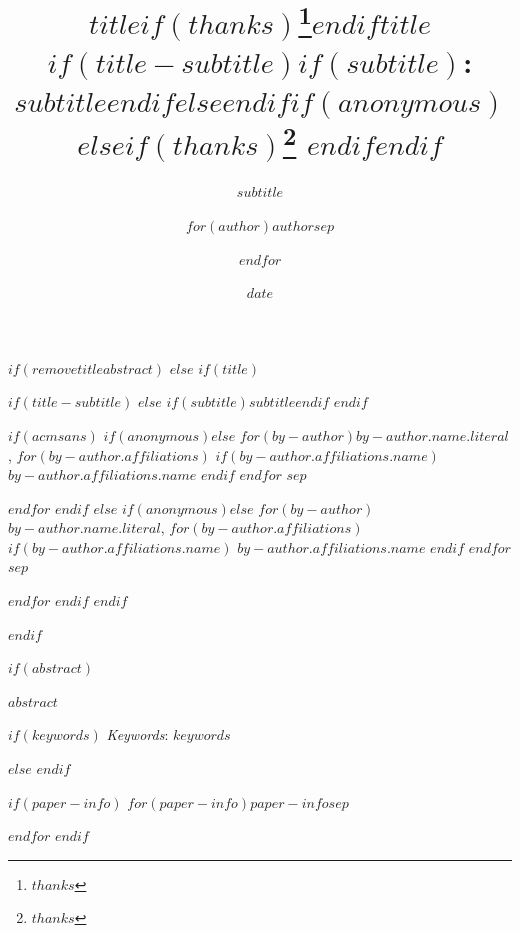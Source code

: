 \documentclass[
$if(fontsize)$
  $fontsize$,
$endif$
$if(lang)$
  $babel-lang$,
$endif$
$if(papersize)$
  $papersize$paper,
$endif$
$if(beamer)$
  ignorenonframetext,
$if(handout)$
  handout,
$endif$
$if(aspectratio)$
  aspectratio=$aspectratio$,
$endif$
$endif$
$for(classoption)$
  $classoption$$sep$,
$endfor$
]{$documentclass$}
\title{$title$$if(thanks)$\thanks{$thanks$}$endif$}
\subtitle{$subtitle$}
\author{$for(author)$$author$$sep$ \and $endfor$}
\date{$date$}
\institute{$for(institute)$$institute$$sep$ \and $endfor$}
\title{$title$$if(title-subtitle)$$if(subtitle)$: $subtitle$$endif$$else$$endif$$if(anonymous)$$else$$if(thanks)$\thanks{$thanks$} $endif$$endif$ }
\date{}
\renewenvironment{abstract}
 {{%
    \setlength{\leftmargin}{0mm}
    \setlength{\rightmargin}{\leftmargin}%
  }%
  \relax}
 {\endlist}
\begin{document}
 



$if(removetitleabstract)$
$else$
$if(title)$

{%
\setlength{\parindent}{0pt}
\thispagestyle{plain}
{%
\maketitle  %
}

$if(title-subtitle)$
$else$
$if(subtitle)$\emph{$subtitle$}$endif$
$endif$

{
   \vskip 13.5pt\relax \normalsize\fontsize{11}{12}
   $if(acmsans)$
$if(anonymous)$\hfill $else$
$for(by-author)$\MakeUppercase{\textsf{\large $by-author.name.literal$}}, 
\small{
$for(by-author.affiliations)$
$if(by-author.affiliations.name)$
$by-author.affiliations.name$
$endif$
$endfor$
}  $sep$ \par 
$endfor$ $endif$
$else$
$if(anonymous)$\hfill $else$
$for(by-author)$\MakeUppercase{$by-author.name.literal$}, 
\small{
$for(by-author.affiliations)$
$if(by-author.affiliations.name)$
$by-author.affiliations.name$
$endif$
$endfor$
}  $sep$ \par \vskip -3.5pt $endfor$ $endif$
$endif$

}

}


$endif$



$if(abstract)$



\begin{abstract}


    \vskip 8.5pt %

\noindent \small{$abstract$}

$if(keywords)$
\vskip 8.5pt \noindent \emph{Keywords}: $keywords$ \par
$else$
$endif$

$if(paper-info)$
$for(paper-info)$$paper-info$$sep$\vspace{1pt}\par
$endfor$
$endif$

\end{abstract}
\end{document}
